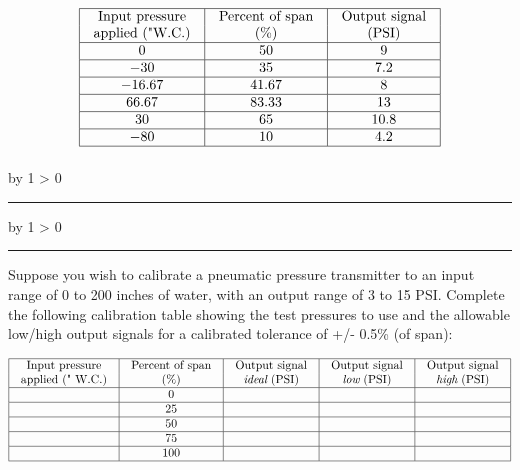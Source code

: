 \documentclass[12pt,a4paper]{article}
\def\oppgave{
            \advance\questnum by 1
            \ifnum \questnum > 0
                 \hrule
                 \vskip 3pt
                 \leftline{Oppgave \the\questnum}
                 \vskip 3pt \fi}
\def\notes{
           \advance\explnum by 1
           \ifnum \explnum > 0
                \hrule
                \vskip 3pt
                \leftline{Notes \the\explnum}
                \vskip 3pt \fi}
\begin{document}
$$\vbox{\offinterlineskip
\halign{\strut
\vrule \quad\hfil # \ \hfil & 
\vrule \quad\hfil # \ \hfil & 
\vrule \quad\hfil # \ \hfil \vrule \cr
\noalign{\hrule}
%
Input pressure & Percent of span & Output signal \cr
%
applied ("W.C.) & (\%) & (PSI) \cr
%
\noalign{\hrule}
%
0 & 50 & 9 \cr
%
\noalign{\hrule}
%
$-30$ & 35 & 7.2 \cr
%
\noalign{\hrule}
%
$-16.67$ & 41.67 & 8 \cr
%
\noalign{\hrule}
%
66.67 & 83.33 & 13 \cr
%
\noalign{\hrule}
%
30 & 65 & 10.8 \cr
%
\noalign{\hrule}
%
$-80$ & 10 & 4.2 \cr
%
\noalign{\hrule}
} %
}$$ %


\vskip 10pt \filbreak 





\notes{} 




\vfil \eject 



\oppgave{} 

Suppose you wish to calibrate a pneumatic pressure transmitter to an input range of 0 to 200 inches of water, with an output range of 3 to 15 PSI.  Complete the following calibration table showing the test pressures to use and the allowable low/high output signals for a calibrated tolerance of +/- 0.5\% (of span):


$$\vbox{\offinterlineskip
\halign{\strut
\vrule \quad\hfil # \ \hfil & 
\vrule \quad\hfil # \ \hfil & 
\vrule \quad\hfil # \ \hfil & 
\vrule \quad\hfil # \ \hfil & 
\vrule \quad\hfil # \ \hfil \vrule \cr
\noalign{\hrule}
%
Input pressure & Percent of span & Output signal & Output signal & Output signal \cr
%
applied (" W.C.) & (\%) & {\it ideal} (PSI) & {\it low} (PSI) & {\it high} (PSI) \cr
%
\noalign{\hrule}
%
 & 0 & & & \cr
%
\noalign{\hrule}
%
 & 25 & & & \cr
%
\noalign{\hrule}
%
 & 50 & & & \cr
%
\noalign{\hrule}
%
 & 75 & & & \cr
%
\noalign{\hrule}
%
 & 100 & & & \cr
%
\noalign{\hrule}
} %
}$$ %
\end{document}
